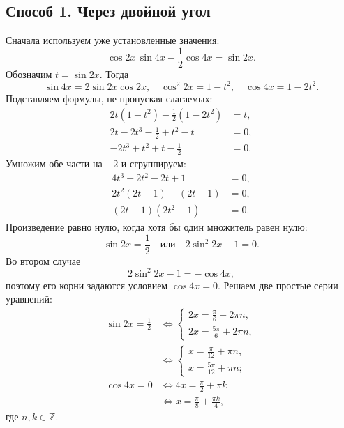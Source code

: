 \documentclass[a4paper,11pt]{article}
\begin{document}
\subsection*{Способ 1. Через двойной угол}
Сначала используем уже установленные значения:
\[
\cos 2x\,\sin 4x-\frac12\cos 4x=\sin 2x.
\]
Обозначим \(t=\sin 2x\). Тогда
\[
\sin 4x=2\sin 2x\cos 2x,\quad
\cos^2 2x=1-t^2,\quad
\cos 4x=1-2t^2.
\]
Подставляем формулы, не пропуская слагаемых:
\begin{align*}
2t(1-t^2)-\tfrac12(1-2t^2)&=t,\\
2t-2t^3-\tfrac12+t^2-t&=0,\\
-2t^3+t^2+t-\tfrac12&=0.
\end{align*}
Умножим обе части на \(-2\) и сгруппируем:
\begin{align*}
4t^3-2t^2-2t+1&=0,\\
2t^2(2t-1)-(2t-1)&=0,\\
(2t-1)(2t^2-1)&=0.
\end{align*}
Произведение равно нулю, когда хотя бы один множитель равен нулю:
\[
\sin 2x=\frac12
\quad\text{или}\quad
2\sin^2 2x-1=0.
\]
Во втором случае
\[
2\sin^2 2x-1=-\cos 4x,
\]
поэтому его корни задаются условием \(\cos 4x=0\). Решаем две простые серии уравнений:
\begin{align*}
\sin 2x=\tfrac12
&\iff
\begin{cases}
2x=\frac\pi6+2\pi n,\\
2x=\frac{5\pi}6+2\pi n,
\end{cases}\\[-2pt]
&\iff
\begin{cases}
x=\frac\pi{12}+\pi n,\\x=\frac{5\pi}{12}+\pi n;
\end{cases}\\[3pt]
\cos 4x=0
&\iff 4x=\frac\pi2+\pi k\\
&\iff x=\frac\pi8+\frac{\pi k}4,
\end{align*}
где \(n,k\in\mathbb Z\).
\end{document}
